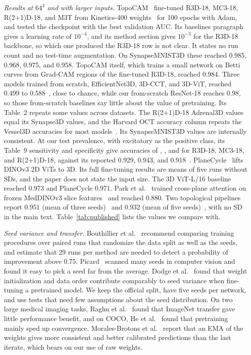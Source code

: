 \documentclass[conference]{IEEEtran}
\newif\ifanycitation
\let\citeAnyKey\cite
\renewcommand{\cite}{\global\anycitationtrue\citeAnyKey}
\begin{document}
\emph{Results at $64^3$ and with larger inputs.} TopoCAM~\cite{nuwagira2026topocam}
fine-tuned R3D-18, MC3-18, R(2+1)D-18, and M3T from Kinetics-400
weights~\cite{tran2018closer,kay2017kinetics} for 100 epochs with Adam, and tested the
checkpoint with the best validation AUC. Its baselines paragraph gives a learning rate of
$10^{-4}$, and its method section gives $10^{-3}$ for the R3D-18 backbone, so which one
produced the R3D-18 row is not clear. It states no run count and no test-time augmentation.
On SynapseMNIST3D these reached 0.985, 0.968, 0.975, and 0.958. TopoCAM itself, which trains
a small network on Betti curves from Grad-CAM regions of the fine-tuned R3D-18, reached
0.984. Three models trained from scratch, EfficientNet3D, 3D-CCT, and 3D-ViT, reached 0.499
to 0.588~\cite{nuwagira2026topocam}, close to chance, while our from-scratch ResNet-18
reaches 0.98, so those from-scratch baselines say little about the value of
pretraining. Its Table~2 repeats some values across datasets. The
R(2+1)D-18 Adrenal3D values equal its Synapse3D values, and the Harvard OCT accuracy column
repeats the Vessel3D accuracies for most models~\cite{nuwagira2026topocam}. Its SynapseMNIST3D values are internally consistent. At our test prevalence, with
excitatory as the positive class, its Table~9 sensitivity and specificity give accuracies of
\topoRebuiltRThreeD{}, \topoRebuiltMCThree{}, and \topoRebuiltRTwoPlusOne{} for R3D-18,
MC3-18, and R(2+1)D-18, against its reported 0.929, 0.943, and
0.918~\cite{nuwagira2026topocam}.
PlaneCycle~\cite{yu2026planecycle} lifts DINOv3 2D ViTs to 3D. Its full fine-tuning results
are means of five runs without SDs, and the paper does not state the input size. The 3D ViT-L/16 baseline reached 0.973 and PlaneCycle
0.971. Park et al.~\cite{park2026axial} trained cross-plane attention on frozen MedDINOv3
slice features~\cite{li2025meddinov3} and reached 0.880. Two topological pipelines report
0.951 (mean of three seeds)~\cite{liu2026manifold} and 0.932 (mean of five
seeds)~\cite{wachira2026combinatorial}, with no SD in the main text. Table~\ref{tab:published} lists the values we
compare with.

\emph{Seed variance and transfer.} Bouthillier et al.~\cite{bouthillier2021variance}
recommend comparing training procedures over paired runs that randomize the data split as
well as the seeds, and estimate that 29 runs per method are needed to detect a probability
of improvement above 0.75. Picard~\cite{picard2021seed} scanned many seeds in computer
vision and found it easy to pick a seed far from the average. Dodge et al.~\cite{dodge2020finetuning} found that weight initialization
and data order contribute comparably to seed variance when fine-tuning a pretrained model.
We keep the official split, have five seeds per network, and use tests that need few
assumptions about the seed distribution. On two large medical imaging tasks, Raghu et al.~\cite{raghu2019transfusion}
found that ImageNet transfer gave little performance benefit, and on COCO, He et
al.~\cite{he2019rethinking} found that pretraining mainly sped up convergence. Morales-Brotons et
al.~\cite{morales2024ema} report that an EMA of the weights gives more consistent and better
calibrated predictions than the last iterate, which bears on our use of raw weights.
\end{document}
